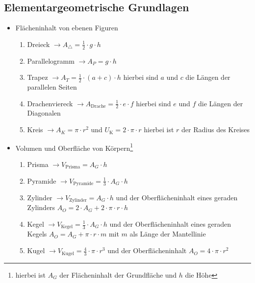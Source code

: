 \subsection{Elementargeometrische Grundlagen}
\begin{itemize}
\item Flächeninhalt von ebenen Figuren\\
\begin{enumerate}
\item Dreieck $\longrightarrow A_{\triangle} = \frac{1}{2} \cdot g\cdot h$\\
\item Parallelogramm $\longrightarrow A_{P} = g\cdot h$\\
\item Trapez $\longrightarrow A_{T} = \frac{1}{2} \cdot (a+c)\cdot h$ hierbei sind $a$ und $c$ die Längen der parallelen Seiten \\
\item Drachenviereck $\longrightarrow A_{\text{Drache}} = \frac{1}{2} \cdot e\cdot f$ hierbei sind $e$ und $f$ die Längen der Diagonalen \\
\item  Kreis  $\longrightarrow A_{K} = \pi \cdot r^2$ und $U_{\text{K}} = 2\cdot \pi \cdot r$ hierbei ist $r$ der Radius des Kreises
\end{enumerate}
\item Volumen und Oberfläche von Körpern\footnote{hierbei ist $A_G$ der Flächeninhalt der Grundfläche und $h$ die Höhe}\\
\begin{enumerate}
\item Prisma $\longrightarrow V_{\text{Prisma}} = A_G \cdot h$  \\
\item Pyramide $\longrightarrow V_{\text{Pyramide}} = \frac{1}{3}\cdot A_G \cdot h$ \\
\item Zylinder $\longrightarrow V_{\text{Zylinder}} = A_G \cdot h$ und der Oberflächeninhalt eines geraden Zylinders $A_O = 2\cdot A_G + 2\cdot \pi\cdot r \cdot h$\\
\item Kegel $\longrightarrow V_{\text{Kegel}} = \frac{1}{3} \cdot A_G \cdot h$ und der Oberflächeninhalt eines geraden Kegels $A_O = A_G +  \pi\cdot r \cdot m$ mit $m $ als Länge der Mantellinie\\
\item Kugel $\longrightarrow V_{\text{Kugel}} = \frac{4}{3} \cdot \pi \cdot r^3$ und der Oberflächeninhalt $A_O = 4\cdot \pi \cdot r^2$
\end{enumerate}
\end{itemize}
